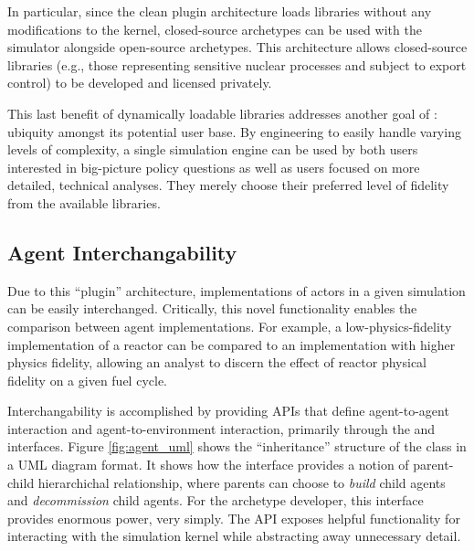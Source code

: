 In particular, since the clean plugin architecture loads libraries without any
modifications to the \Cyclus kernel, closed-source archetypes can be used with
the simulator alongside open-source archetypes. This architecture
allows closed-source libraries (e.g., those representing sensitive nuclear
processes and subject to export control) to be developed and licensed privately.

This last benefit of dynamically loadable libraries addresses
another goal of \Cyclus: ubiquity amongst its potential user base. By
engineering \Cyclus to easily handle varying levels of complexity, a single
simulation engine can be used by both users interested in big-picture policy
questions as well as users focused on more detailed, technical
analyses. They merely choose their preferred level of fidelity from the 
available libraries. 

\subsection{Agent Interchangability}\label{sec:interchangeability}

Due to this ``plugin'' architecture,
implementations of actors in a given simulation can be easily
interchanged. Critically, this novel functionality enables the comparison
between agent implementations. For example, a low-physics-fidelity
implementation of a reactor can be compared to an implementation with higher
physics fidelity, allowing an analyst to discern the effect of reactor physical
fidelity on a given fuel cycle. 

Interchangability is accomplished by providing \glspl{API} that define agent-to-agent
interaction and agent-to-environment interaction, primarily through the
 and  interfaces. Figure \ref{fig:agent_uml} shows 
the ``inheritance'' structure of the  class in a \gls{UML} diagram 
format. It shows how the  interface
provides a notion of parent-child hierarchichal relationship, where parents can
choose to \textit{build} child agents and \textit{decommission} child
agents. For the archetype developer, this interface provides enormous power, 
very simply. The \gls{API} exposes  helpful functionality for 
interacting with the \Cyclus simulation kernel while abstracting away unnecessary 
detail.

